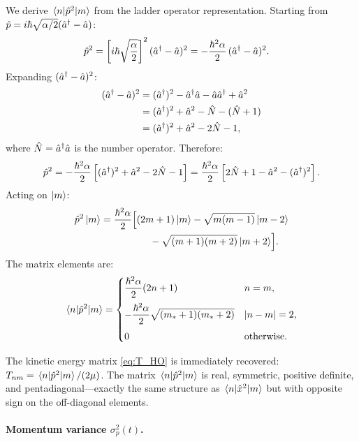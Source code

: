 We derive $\mel{n}{\hat{p}^2}{m}$ from the ladder operator representation.
Starting from $\hat{p} = i\hbar\sqrt{\alpha/2}(\hat{a}^{\dagger} - \hat{a})$:
\begin{align}
  \hat{p}^2
  &= \left[i\hbar\sqrt{\frac{\alpha}{2}}\right]^2 (\hat{a}^{\dagger} - \hat{a})^2
   = -\frac{\hbar^2\alpha}{2}\,(\hat{a}^{\dagger} - \hat{a})^2.
\end{align}
Expanding $(\hat{a}^{\dagger} - \hat{a})^2$:
\begin{align}
  (\hat{a}^{\dagger} - \hat{a})^2
  &= (\hat{a}^{\dagger})^2 - \hat{a}^{\dagger}\hat{a} - \hat{a}\hat{a}^{\dagger} + \hat{a}^2\notag\\
  &= (\hat{a}^{\dagger})^2 + \hat{a}^2 - \hat{N} - (\hat{N}+1)\notag\\
  &= (\hat{a}^{\dagger})^2 + \hat{a}^2 - 2\hat{N} - 1,
\end{align}
where $\hat{N} = \hat{a}^{\dagger}\hat{a}$ is the number operator.
Therefore:
\begin{equation}\label{eq:p2_op}
  \hat{p}^2 = -\frac{\hbar^2\alpha}{2}\left[(\hat{a}^{\dagger})^2 + \hat{a}^2 - 2\hat{N} - 1\right]
  = \frac{\hbar^2\alpha}{2}\left[2\hat{N} + 1 - \hat{a}^2 - (\hat{a}^{\dagger})^2\right].
\end{equation}
Acting on $\ket{m}$:
\begin{align}
  \hat{p}^2\ket{m}
  &= \frac{\hbar^2\alpha}{2}\Bigl[(2m+1)\ket{m}
    - \sqrt{m(m-1)}\ket{m-2}\notag\\
  &\qquad\qquad\quad - \sqrt{(m+1)(m+2)}\ket{m+2}\Bigr].
\end{align}
The matrix elements are:
\begin{equation}\label{eq:p2_mel}
  \mel{n}{\hat{p}^2}{m} =
  \begin{cases}
    \dfrac{\hbar^2\alpha}{2}(2n+1) & n = m,\\[8pt]
    -\dfrac{\hbar^2\alpha}{2}\sqrt{(m_*+1)(m_*+2)} & |n-m| = 2,\\[8pt]
    0 & \text{otherwise.}
  \end{cases}
\end{equation}

\begin{remark}
The kinetic energy matrix \cref{eq:T_HO} is immediately recovered: $T_{nm} = \mel{n}{\hat{p}^2}{m}/(2\mu)$.
The matrix $\mel{n}{\hat{p}^2}{m}$ is real, symmetric, positive definite, and pentadiagonal---exactly the same structure as $\mel{n}{\hat{x}^2}{m}$ but with opposite sign on the off-diagonal elements.
\end{remark}

\paragraph{Momentum variance $\sigma_p^2(t)$.}

